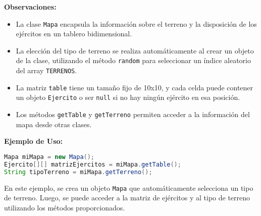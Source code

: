 \textbf{Observaciones:}
\begin{itemize}
  \item La clase \texttt{Mapa} encapsula la información sobre el terreno y la disposición de los ejércitos en un tablero bidimensional.
  \item La elección del tipo de terreno se realiza automáticamente al crear un objeto de la clase, utilizando el método \texttt{random} para seleccionar un índice aleatorio del array \texttt{TERRENOS}.
  \item La matriz \texttt{table} tiene un tamaño fijo de 10x10, y cada celda puede contener un objeto \texttt{Ejercito} o ser \texttt{null} si no hay ningún ejército en esa posición.
  \item Los métodos \texttt{getTable} y \texttt{getTerreno} permiten acceder a la información del mapa desde otras clases.
\end{itemize}

\textbf{Ejemplo de Uso:}
\begin{lstlisting}[language=Java]
Mapa miMapa = new Mapa();
Ejercito[][] matrizEjercitos = miMapa.getTable();
String tipoTerreno = miMapa.getTerreno();
\end{lstlisting}

En este ejemplo, se crea un objeto \texttt{Mapa} que automáticamente selecciona un tipo de terreno. Luego, se puede acceder a la matriz de ejércitos y al tipo de terreno utilizando los métodos proporcionados.
